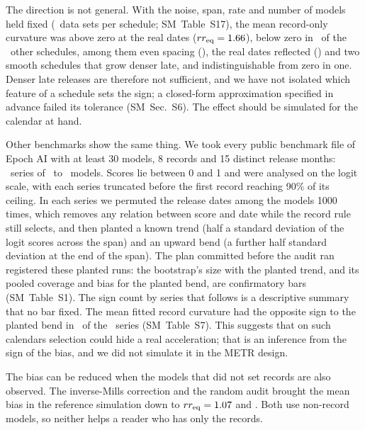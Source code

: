 \documentclass[aps,pre,twocolumn,superscriptaddress,nofootinbib,10pt]{revtex4-2}
\newcommand{\SM}{SM}
\newcommand{\rreq}{rr_{\rm eq}}
\begin{document}
The direction is not general. With the noise, span, rate and number of models held fixed (\cfReps\ data sets per schedule; \SM\ Table~S17), the mean record-only curvature was above zero at the real dates ($\rreq=\cfRealRr$), below zero in \cfNeg\ of the \cfOther\ other schedules, among them even spacing (\cfEvenRr), the real dates reflected (\cfReflRr) and two smooth schedules that grow denser late, and indistinguishable from zero in one. Denser late releases are therefore not sufficient, and we have not isolated which feature of a schedule sets the sign; a closed-form approximation specified in advance failed its tolerance (\SM\ Sec.~S6). The effect should be simulated for the calendar at hand.

Other benchmarks show the same thing. We took every public benchmark file of Epoch AI \cite{epochdata} with at least 30 models, 8 records and 15 distinct release months: \mbN\ series of \mbMmin\ to \mbMmax\ models. Scores lie between 0 and 1 and were analysed on the logit scale, with each series truncated before the first record reaching 90\% of its ceiling. In each series we permuted the release dates among the models 1000 times, which removes any relation between score and date while the record rule still selects, and then planted a known trend (half a standard deviation of the logit scores across the span) and an upward bend (a further half standard deviation at the end of the span). The plan committed before the audit ran registered these planted runs: the bootstrap's size with the planted trend, and its pooled coverage and bias for the planted bend, are confirmatory bars (\SM\ Table~S1). The sign count by series that follows is a descriptive summary that no bar fixed. The mean fitted record curvature had the opposite sign to the planted bend in \mbBiasNegSign\ of the \mbN\ series (\SM\ Table~S7). This suggests that on such calendars selection could hide a real acceleration; that is an inference from the sign of the bias, and we did not simulate it in the METR design.

The bias can be reduced when the models that did not set records are also observed. The inverse-Mills correction and the random audit brought the mean bias in the reference simulation down to $\rreq=\biasRrHeck$ and \biasRrAudit. Both use non-record models, so neither helps a reader who has only the records.
\end{document}
